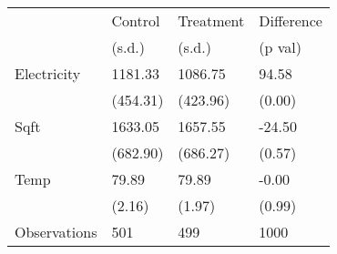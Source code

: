 \begin{tabular}{llll}
\toprule
 & Control & Treatment & Difference \\
 & (s.d.) & (s.d.) & (p val) \\
\midrule
Electricity & 1181.33 & 1086.75 & 94.58 \\
  & (454.31) & (423.96) & (0.00) \\
Sqft & 1633.05 & 1657.55 & -24.50 \\
  & (682.90) & (686.27) & (0.57) \\
Temp & 79.89 & 79.89 & -0.00 \\
  & (2.16) & (1.97) & (0.99) \\
Observations & 501 & 499 & 1000 \\
\bottomrule
\end{tabular}
